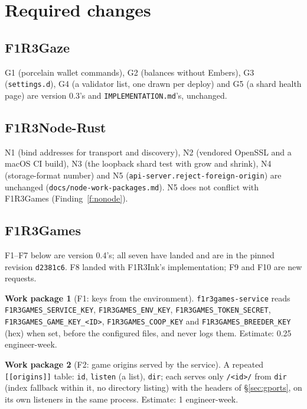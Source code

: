 \documentclass[11pt]{article}
\theoremstyle{definition}
\newtheorem{workpackage}{Work package}
\theoremstyle{remark}
\newcommand{\code}[1]{\texttt{#1}}
\newcommand{\Gz}{F1R3Gaze}
\newcommand{\Nd}{F1R3Node-Rust}
\newcommand{\Gm}{F1R3Games}
\newcommand{\Svc}{\code{f1r3games-service}}
\newcommand{\Em}{Embers}
\begin{document}
\section{Required changes}\label{sec:wp}

\subsection{\Gz{}}
G1 (porcelain wallet commands), G2 (balances without \Em{}), G3 (\code{settings.d}),
G4 (a validator list, one drawn per deploy) and G5 (a shard health page) are
version 0.3's and \code{IMPLEMENTATION.md}'s, unchanged.

\subsection{\Nd{}}
N1 (bind addresses for transport and discovery), N2 (vendored OpenSSL and a macOS
CI build), N3 (the loopback shard test with grow and shrink), N4 (storage-format
number) and N5 (\code{api-server.reject-foreign-origin}) are unchanged
(\code{docs/node-work-packages.md}). N5 does not conflict with \Gm{}
(Finding~\ref{f:nonode}).

\subsection{\Gm{}}\label{sec:fwp}

F1--F7 below are version 0.4's; all seven have landed and are in the pinned revision
\code{d2381c6}. F8 landed with F1R3Ink's implementation; F9 and F10 are new requests.

\begin{workpackage}[F1: keys from the environment]\label{wp:f1}
\Svc{} reads \code{F1R3GAMES\_SERVICE\_KEY}, \code{F1R3GAMES\_ENV\_KEY},
\code{F1R3GAMES\_TOKEN\_SECRET}, \code{F1R3GAMES\_GAME\_KEY\_<ID>},
\code{F1R3GAMES\_COOP\_KEY} and \code{F1R3GAMES\_BREEDER\_KEY} (hex) when set, before
the configured files, and never logs them. Estimate: 0.25 engineer-week.
\end{workpackage}

\begin{workpackage}[F2: game origins served by the service]\label{wp:f2}
A repeated \code{[[origins]]} table: \code{id}, \code{listen} (a list), \code{dir};
each serves only \code{/<id>/} from \code{dir} (index fallback within it, no
directory listing) with the headers of \S\ref{sec:gports}, on its own listeners in
the same process. Estimate: 1 engineer-week.
\end{workpackage}
\end{document}
